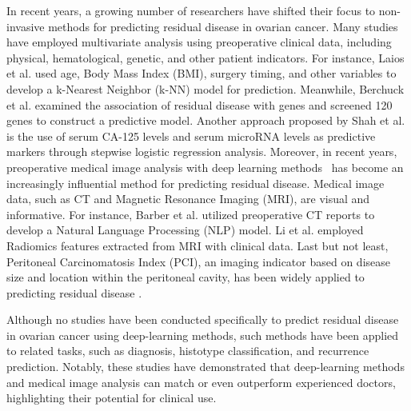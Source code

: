 In recent years, a growing number of researchers have shifted their focus to non-invasive methods for predicting residual disease in ovarian cancer. Many studies have employed multivariate analysis using preoperative clinical data, including physical, hematological, genetic, and other patient indicators. 
For instance, Laios et al.\cite{laios2020predicting, laios2020247} used age, Body Mass Index (BMI), surgery timing, and other variables to develop a k-Nearest Neighbor (k-NN) model for prediction. Meanwhile, Berchuck et al.\cite{berchuck2004prediction} examined the association of residual disease with genes and screened 120 genes to construct a predictive model.
Another approach proposed by Shah et al.\cite{shah2018combining} is the use of serum CA-125 levels and serum microRNA levels as predictive markers through stepwise logistic regression analysis. 
Moreover, in recent years, preoperative medical image analysis with deep learning methods~\cite{shi2021darnet} has become an increasingly influential method for predicting residual disease. Medical image data, such as CT and Magnetic Resonance Imaging (MRI), are visual and informative.
For instance, Barber et al.\cite{barber2021natural} utilized preoperative CT reports to develop a Natural Language Processing (NLP) model.
Li et al.\cite{li2021noninvasive} employed Radiomics\cite{gillies2016radiomics} features extracted from MRI with clinical data. 
Last but not least, Peritoneal Carcinomatosis Index (PCI), an imaging indicator based on disease size and location within the peritoneal cavity, has been widely applied to predicting residual disease \cite{llueca2018prediction, engbersen2019mri, jonsdottir2021peritoneal, li2022diffusion}.


Although no studies have been conducted specifically to predict residual disease in ovarian cancer using deep-learning methods, such methods have been applied to related tasks, such as diagnosis\cite{saida2022diagnosing}, histotype classification\cite{farahani2022deep}, and recurrence prediction\cite{wang2019deep}. 
Notably, these studies have demonstrated that deep-learning methods and medical image analysis can match or even outperform experienced doctors, highlighting their potential for clinical use.

